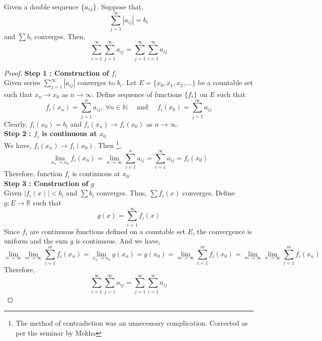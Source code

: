\begin{theorem}
	Given a double sequence $\left\{a_{ij}\right\}$.
	Suppose that,
	\[ \sum_{j=1}^\infty |a_{ij}| = b_i \]
	and $\sum b_i$ converges.
	Then,
	\[ \sum_{i=1}^\infty \sum_{j=1}^\infty a_{ij} = \sum_{j=1}^\infty \sum_{i=1}^\infty a_{ij} \]
\end{theorem}
\begin{proof}
	\textbf{Step 1 : Construction of $f_i$}\\
	Given series $\displaystyle \sum_{j=1}^\infty |a_{ij}|$ converges to $b_i$.
	Let $E = \{ x_0,x_1,x_2,\dots \}$ be a countable set such that $x_n \to x_0$ as $n \to \infty$.
	Define sequence of functions $\left\{f_i\right\}$ on $E$ such that 
	\[ f_i(x_n) = \sum_{j=1}^n a_{ij},\ \forall n \in \mathbb{N} \quad \text{ and } \quad f_i(x_0) = \sum_{j=1}^\infty a_{ij} \]
	Clearly, $f_i(x_0) = b_i$ and $f_i(x_n) \to f_i(x_0)$ as $n \to \infty$.\\

	\textbf{Step 2 : $f_i$ is continuous at $x_0$}\\
	We have, $f_i(x_n) \to f_i(x_0)$.
	{\color{red}Then \dag\footnote{
		The method of contradiction was an unnecessary complication.
		Corrected as per the seminar by Mekha},
	\[ \lim_{x_n \to x_0} f_i(x_n) = \lim_{n \to \infty} \sum_{i=1}^n a_{ij} = \sum_{i=1}^\infty a_{ij} = f_i(x_0) \]
	}
	Therefore, function $f_i$ is continuous at $x_0$.\\

	\textbf{Step 3 : Construction of $g$}\\
	Given $|f_i(x)| < b_i$ and $\sum b_i$ converges.
	Thus, $\sum f_i(x)$ converges.
	Define $g : E \to \mathbb{R}$ such that
	\[ g(x) = \sum_{i = 1}^\infty f_i(x) \]
	Since $f_i$ are continuous functions defined on a countable set $E$, the convergence is uniform and the sum $g$ is continuous.
	And we have,
	\[ \lim_{n \to \infty} \lim_{m \to \infty} \sum_{i=1}^m f_i(x_n) = \lim_{x_n \to x_0} g(x_n) = g(x_0) = \lim_{m \to \infty} \sum_{i=1}^m f_i(x_0) = \lim_{m \to \infty} \lim_{n \to \infty} \sum_{i = 1}^m f_i(x_n) \]
	{\color{red}
	Therefore,
	\[ \sum_{i=1}^\infty \sum_{j=1}^\infty a_{ij} = \sum_{j=1}^\infty \sum_{i=1}^\infty a_{ij} \]
	}
\end{proof}

